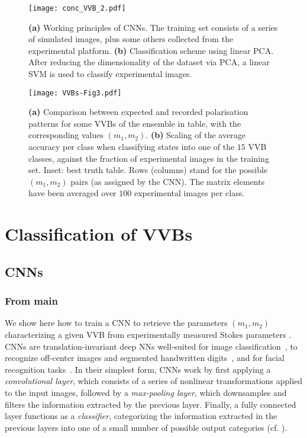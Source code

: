 \begin{figure}[tb]
	\centering
	\texttt{[image: conc\_VVB\_2.pdf]}
	\caption{
	\textbf{(a)}
	Working principles of \acp{CNN}. The training set consists of a series of simulated images, plus some others collected from the experimental platform.
	\textbf{(b)}
	Classification scheme using linear \ac{PCA}.
	After reducing the dimensionality of the dataset via \ac{PCA}, a linear \ac{SVM} is used to classify experimental images. 
	}
	\label{fig:VVBs:class_techniques}
\end{figure}

\begin{figure}[tb]
    \centering
    \texttt{[image: VVBs-Fig3.pdf]}
    \caption{
	    \textbf{(a)} Comparison between expected and recorded polarisation patterns for some \acp{VVB} of the ensemble in table, with the corresponding values $(m_1,m_2)$.
	    \textbf{(b)} Scaling of the average accuracy per class when classifying states into one of the $15$ VVB classes,
	    against the fraction of experimental images in the training set. 
	    Inset: best truth table.
	    Rows (columns) stand for the possible $(m_1,m_2)$ pairs (as assigned by the CNN). The matrix elements have been averaged over $100$ experimental images per class.
    }%
    \label{fig:VVBs:resultsCNN}
\end{figure}



\section{Classification of VVBs}
\label{sec:VVBs:classification}


\subsection{CNNs}
\label{sec:VVBs:CNNs}

\subsubsection{From main}

We show here how to train a \ac{CNN}  to retrieve the  parameters $(m_1,m_2)$ characterizing a given VVB  from experimentally  measured Stokes parameters .
\acp{CNN}  are translation-invariant deep NNs well-suited for image classification~\cite{lecun2015deep},  to recognize off-center images and segmented handwritten digits~\cite{simard2003best,ciresan2011flexible},
and for facial recognition tasks~\cite{matsugu2003subject}. 
In their simplest form, \acp{CNN} work by first applying a \emph{convolutional layer}, which consists of a series of nonlinear transformations applied to the input images, followed by a \emph{max-pooling layer}, which downsamples and filters the information extracted by the previous layer. Finally, a fully connected layer functions as a \emph{classifier}, categorizing the information extracted in the previous layers into one of a small number of possible output categories
 (cf. \cite{SI}).
 
